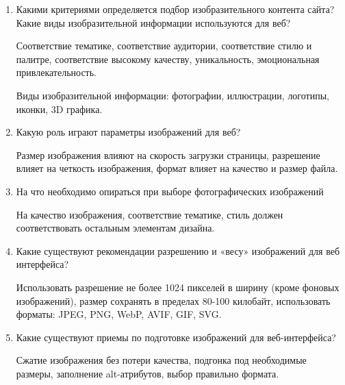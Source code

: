 \begin{enumerate}
    \item Какими критериями определяется подбор изобразительного контента сайта?Какие виды изобразительной информации используются для веб?

        Соответствие тематике, соответствие аудитории, соответствие стилю и палитре, соответствие высокому качеству, уникальность, эмоциональная привлекательность.
        \bigskip

        Виды изобразительной информации:
        фотографии, иллюстрации, логотипы, иконки, 3D графика.
    \item Какую роль играют параметры изображений для веб?

        Размер изображения влияют на скорость загрузки страницы, разрешение влияет на четкость изображения, формат влияет на качество и размер файла.
    \item На что необходимо опираться при выборе фотографических изображений

        На качество изображения, соответствие тематике, стиль должен соответствовать остальным элементам дизайна.
    \item Какие существуют рекомендации разрешению и «весу» изображений для веб интерфейса?

        Использовать разрешение не более 1024 пикселей в ширину (кроме фоновых изображений), размер сохранять в пределах 80-100 килобайт, использовать форматы: JPEG, PNG, WebP, AVIF, GIF, SVG.
    \item Какие существуют приемы по подготовке изображений для веб-интерфейса?

        Сжатие изображения без потери качества, подгонка под необходимые размеры, заполнение alt-атрибутов, выбор правильно формата.
\end{enumerate}


